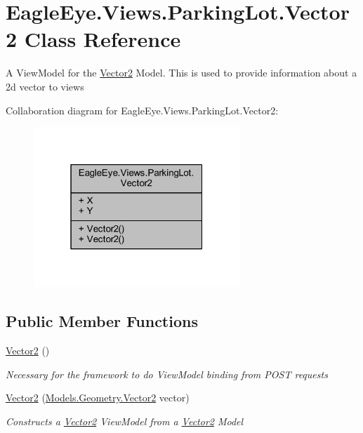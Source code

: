 \hypertarget{class_eagle_eye_1_1_views_1_1_parking_lot_1_1_vector2}{}\section{Eagle\+Eye.\+Views.\+Parking\+Lot.\+Vector2 Class Reference}
\label{class_eagle_eye_1_1_views_1_1_parking_lot_1_1_vector2}


A View\+Model for the \mbox{\hyperlink{class_eagle_eye_1_1_views_1_1_parking_lot_1_1_vector2}{Vector2}} Model. This is used to provide information about a 2d vector to views  




Collaboration diagram for Eagle\+Eye.\+Views.\+Parking\+Lot.\+Vector2\+:\nopagebreak
\begin{figure}[H]
\begin{center}
\leavevmode
\includegraphics[width=220pt]{class_eagle_eye_1_1_views_1_1_parking_lot_1_1_vector2__coll__graph}
\end{center}
\end{figure}
\subsection*{Public Member Functions}
\begin{DoxyCompactItemize}
\item 
\mbox{\hyperlink{class_eagle_eye_1_1_views_1_1_parking_lot_1_1_vector2_a7ad4985eae411d4785f7da5964fafa8c}{Vector2}} ()
\begin{DoxyCompactList}\small\item\em Necessary for the framework to do View\+Model binding from P\+O\+ST requests \end{DoxyCompactList}\item 
\mbox{\hyperlink{class_eagle_eye_1_1_views_1_1_parking_lot_1_1_vector2_a09d06dd70916e05a76b0da35718ba02c}{Vector2}} (\mbox{\hyperlink{struct_eagle_eye_1_1_models_1_1_geometry_1_1_vector2}{Models.\+Geometry.\+Vector2}} vector)
\begin{DoxyCompactList}\small\item\em Constructs a \mbox{\hyperlink{class_eagle_eye_1_1_views_1_1_parking_lot_1_1_vector2}{Vector2}} View\+Model from a \mbox{\hyperlink{class_eagle_eye_1_1_views_1_1_parking_lot_1_1_vector2}{Vector2}} Model \end{DoxyCompactList}\end{DoxyCompactItemize}
